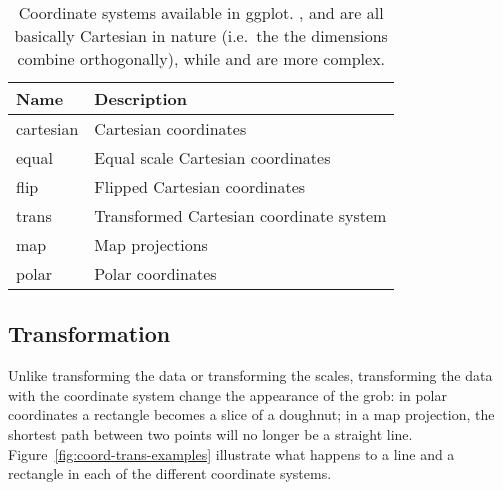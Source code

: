 \begin{table}
  \begin{center}
  \begin{tabular}{ll}
    \toprule
    Name      & Description  \\
    \midrule
    cartesian & Cartesian coordinates                  \\
    equal     & Equal scale Cartesian coordinates      \\
    flip      & Flipped Cartesian coordinates          \\
    trans     & Transformed Cartesian coordinate system\\[1em]
    map       & Map projections                        \\
    polar     & Polar coordinates                      \\
    \bottomrule
    
  \end{tabular}
  \end{center}
  \caption{Coordinate systems available in ggplot.  ,  and  are all basically Cartesian in nature (i.e.\ the the dimensions combine orthogonally), while  and  are more complex.}
  \label{tbl:coord}
\end{table}

\subsection{Transformation}
\label{sub:coord-transformation}

Unlike transforming the data or transforming the scales, transforming the data with the coordinate system change the appearance of the grob: in polar coordinates a rectangle becomes a slice of a doughnut; in a map projection, the shortest path between two points will no longer be a straight line.  Figure~\ref{fig:coord-trans-examples} illustrate what happens to a line and a rectangle in each of the different coordinate systems.

% 


